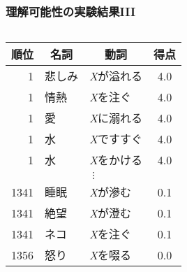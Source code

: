 \documentclass[12pt,usepdftitle=false]{beamer}
\newcommand\header[1]{\multicolumn{1}{c}{\textbf{#1}}}
\begin{document}
\begin{frame}
    \frametitle{理解可能性の実験結果III}
    \begin{columns}
        \begin{column}{0.55\textwidth}
            \begin{table}[t]
                \centering\footnotesize
                \begin{tabular}{rllc}
                    \toprule%
                    \header{順位} & \header{名詞} & \header{動詞} & \header{得点} \\
                    \midrule%
                    1             & 悲しみ        & \emph{X}が溢れる     & 4.0           \\
                    1             & 情熱          & \emph{X}を注ぐ       & 4.0           \\
                    1             & 愛            & \emph{X}に溺れる     & 4.0           \\
                    1             & 水            & \emph{X}ですすぐ     & 4.0           \\
                    1             & 水            & \emph{X}をかける     & 4.0           \\[-1pt]
                    \multicolumn{4}{c}{$\vdots$} \\[2pt]
                    1341          & 睡眠          & \emph{X}が滲む       & 0.1           \\
                    1341          & 絶望          & \emph{X}が澄む       & 0.1           \\
                    1341          & ネコ          & \emph{X}を注ぐ       & 0.1           \\
                    1356          & 怒り          & \emph{X}を啜る       & 0.0           \\

\end{tabular}
\end{table}
\end{column}
\end{columns}
\end{frame}
\end{document}
